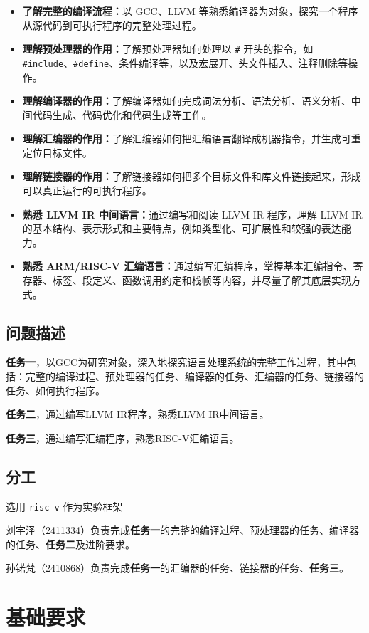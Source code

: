 \documentclass[UTF8,a4paper,10pt]{ctexart}
\begin{document}
\begin{itemize}
    \item \textbf{了解完整的编译流程：}以 GCC、LLVM 等熟悉编译器为对象，探究一个程序从源代码到可执行程序的完整处理过程。
    \item \textbf{理解预处理器的作用：}了解预处理器如何处理以 \texttt{\#} 开头的指令，如 \texttt{\#include}、\texttt{\#define}、条件编译等，以及宏展开、头文件插入、注释删除等操作。
    \item \textbf{理解编译器的作用：}了解编译器如何完成词法分析、语法分析、语义分析、中间代码生成、代码优化和代码生成等工作。
    \item \textbf{理解汇编器的作用：}了解汇编器如何把汇编语言翻译成机器指令，并生成可重定位目标文件。
    \item \textbf{理解链接器的作用：}了解链接器如何把多个目标文件和库文件链接起来，形成可以真正运行的可执行程序。
    \item \textbf{熟悉 LLVM IR 中间语言：}通过编写和阅读 LLVM IR 程序，理解 LLVM IR 的基本结构、表示形式和主要特点，例如类型化、可扩展性和较强的表达能力。
    \item \textbf{熟悉 ARM/RISC-V 汇编语言：}通过编写汇编程序，掌握基本汇编指令、寄存器、标签、段定义、函数调用约定和栈帧等内容，并尽量了解其底层实现方式。
\end{itemize}

\subsection{问题描述}
\textbf{任务一}，以GCC为研究对象，深入地探究语言处理系统的完整工作过程，其中包括：完整的编译过程、预处理器的任务、编译器的任务、汇编器的任务、链接器的任务、如何执行程序。

\textbf{任务二}，通过编写LLVM IR程序，熟悉LLVM IR中间语言。

\textbf{任务三}，通过编写汇编程序，熟悉RISC-V汇编语言。

\subsection{分工}
选用 \texttt{risc-v} 作为实验框架

刘宇泽（2411334）负责完成\textbf{任务一}的完整的编译过程、预处理器的任务、编译器的任务、\textbf{任务二}及进阶要求。

孙锘梵（2410868）负责完成\textbf{任务一}的汇编器的任务、链接器的任务、\textbf{任务三}。
\newpage
\section{基础要求}
\end{document}
